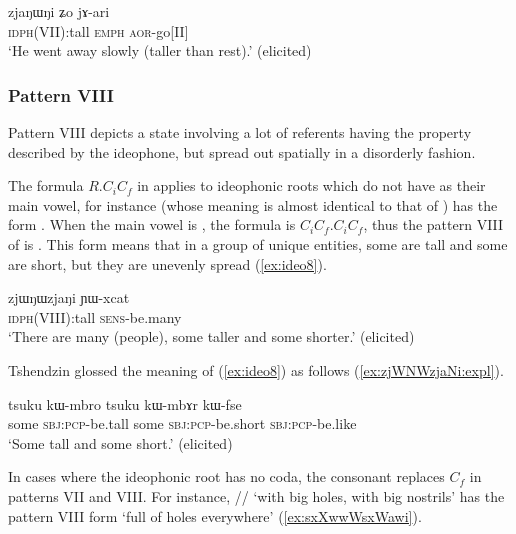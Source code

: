   \begin{exe} 
\ex  \label{ex:ideo7}
\gll  zjaŋɯŋi ʑo jɤ-ari   \\
\textsc{idph}(VII):tall  \textsc{emph} \textsc{aor}-go[II] \\
\glt `He went away slowly (taller than rest).'  (elicited)
 \end{exe}
 
  \subsubsection{Pattern VIII} \label{sec:ideo.VIII}
 Pattern VIII  depicts a state involving a lot of referents having the property described by the ideophone, but spread out spatially in a disorderly fashion. 

The formula $R$.$C_i$$C_f$ in  applies to ideophonic roots  which do  not have  as their main vowel, for instance  (whose meaning is almost identical to that of ) has the form . When the main vowel is , the formula is $C_i$$C_f$.$C_i$$C_f$, thus the pattern VIII of   is . This form means that in a group of unique entities, some are tall and some are short, but  they are unevenly spread (\ref{ex:ideo8}).
	
\begin{exe} 
\ex  \label{ex:ideo8}
\gll  zjɯŋɯzjaŋi ɲɯ-xcat \\
\textsc{idph}(VIII):tall \textsc{sens}-be.many \\
\glt `There are many (people), some taller and some shorter.'   (elicited)
  \end{exe}
	 
 Tshendzin glossed the meaning of (\ref{ex:ideo8}) as follows (\ref{ex:zjWNWzjaNi:expl}).
 
 \begin{exe} 
\ex  \label{ex:zjWNWzjaNi:expl}
\gll  tsuku kɯ-mbro tsuku kɯ-mbɤr kɯ-fse   \\
 some \textsc{sbj}:\textsc{pcp}-be.tall some \textsc{sbj}:\textsc{pcp}-be.short \textsc{sbj}:\textsc{pcp}-be.like \\
 \glt `Some tall and some short.'    (elicited)
  \end{exe}  

  In cases where the ideophonic root has no coda, the consonant  replaces $C_f$ in patterns VII and VIII. For instance, // `with big holes, with big nostrils' has the pattern VIII form  `full of holes everywhere' (\ref{ex:sxXwwWsxWawi}).

